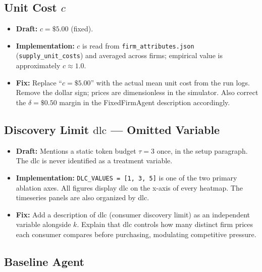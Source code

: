\documentclass{article}
\begin{document}
\subsection{Unit Cost $c$}

\begin{itemize}
  \item \textbf{Draft:} $c = \$5.00$ (fixed).
  \item \textbf{Implementation:} $c$ is read from \texttt{firm\_attributes.json}
        (\texttt{supply\_unit\_costs}) and averaged across firms; empirical value
        is approximately $c \approx 1.0$.
  \item \textbf{Fix:} Replace ``$c = \$5.00$'' with the actual mean unit cost from
        the run logs.  Remove the dollar sign; prices are dimensionless in the
        simulator.  Also correct the $\delta = \$0.50$ margin in the FixedFirmAgent
        description accordingly.
\end{itemize}

\subsection{Discovery Limit $\mathrm{dlc}$ — Omitted Variable}

\begin{itemize}
  \item \textbf{Draft:} Mentions a static token budget $\tau = 3$ once, in the
        setup paragraph.  The dlc is never identified as a treatment variable.
  \item \textbf{Implementation:} \texttt{DLC\_VALUES = [1, 3, 5]} is one of the
        two primary ablation axes.  All figures display dlc on the x-axis of every
        heatmap.  The timeseries panels are also organized by dlc.
  \item \textbf{Fix:} Add a description of dlc (consumer discovery limit) as an
        independent variable alongside $k$.  Explain that $\mathrm{dlc}$ controls
        how many distinct firm prices each consumer compares before purchasing,
        modulating competitive pressure.
\end{itemize}

\subsection{Baseline Agent}
\end{document}
